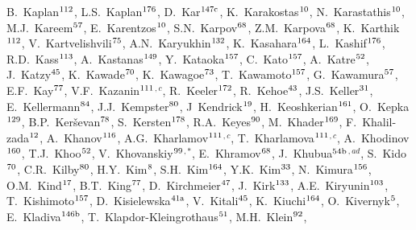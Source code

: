 \begin{flushleft}
B.~Kaplan$^\textrm{\scriptsize 112}$,
L.S.~Kaplan$^\textrm{\scriptsize 176}$,
D.~Kar$^\textrm{\scriptsize 147c}$,
K.~Karakostas$^\textrm{\scriptsize 10}$,
N.~Karastathis$^\textrm{\scriptsize 10}$,
M.J.~Kareem$^\textrm{\scriptsize 57}$,
E.~Karentzos$^\textrm{\scriptsize 10}$,
S.N.~Karpov$^\textrm{\scriptsize 68}$,
Z.M.~Karpova$^\textrm{\scriptsize 68}$,
K.~Karthik$^\textrm{\scriptsize 112}$,
V.~Kartvelishvili$^\textrm{\scriptsize 75}$,
A.N.~Karyukhin$^\textrm{\scriptsize 132}$,
K.~Kasahara$^\textrm{\scriptsize 164}$,
L.~Kashif$^\textrm{\scriptsize 176}$,
R.D.~Kass$^\textrm{\scriptsize 113}$,
A.~Kastanas$^\textrm{\scriptsize 149}$,
Y.~Kataoka$^\textrm{\scriptsize 157}$,
C.~Kato$^\textrm{\scriptsize 157}$,
A.~Katre$^\textrm{\scriptsize 52}$,
J.~Katzy$^\textrm{\scriptsize 45}$,
K.~Kawade$^\textrm{\scriptsize 70}$,
K.~Kawagoe$^\textrm{\scriptsize 73}$,
T.~Kawamoto$^\textrm{\scriptsize 157}$,
G.~Kawamura$^\textrm{\scriptsize 57}$,
E.F.~Kay$^\textrm{\scriptsize 77}$,
V.F.~Kazanin$^\textrm{\scriptsize 111}$$^{,c}$,
R.~Keeler$^\textrm{\scriptsize 172}$,
R.~Kehoe$^\textrm{\scriptsize 43}$,
J.S.~Keller$^\textrm{\scriptsize 31}$,
E.~Kellermann$^\textrm{\scriptsize 84}$,
J.J.~Kempster$^\textrm{\scriptsize 80}$,
J~Kendrick$^\textrm{\scriptsize 19}$,
H.~Keoshkerian$^\textrm{\scriptsize 161}$,
O.~Kepka$^\textrm{\scriptsize 129}$,
B.P.~Ker\v{s}evan$^\textrm{\scriptsize 78}$,
S.~Kersten$^\textrm{\scriptsize 178}$,
R.A.~Keyes$^\textrm{\scriptsize 90}$,
M.~Khader$^\textrm{\scriptsize 169}$,
F.~Khalil-zada$^\textrm{\scriptsize 12}$,
A.~Khanov$^\textrm{\scriptsize 116}$,
A.G.~Kharlamov$^\textrm{\scriptsize 111}$$^{,c}$,
T.~Kharlamova$^\textrm{\scriptsize 111}$$^{,c}$,
A.~Khodinov$^\textrm{\scriptsize 160}$,
T.J.~Khoo$^\textrm{\scriptsize 52}$,
V.~Khovanskiy$^\textrm{\scriptsize 99}$$^{,*}$,
E.~Khramov$^\textrm{\scriptsize 68}$,
J.~Khubua$^\textrm{\scriptsize 54b}$$^{,ad}$,
S.~Kido$^\textrm{\scriptsize 70}$,
C.R.~Kilby$^\textrm{\scriptsize 80}$,
H.Y.~Kim$^\textrm{\scriptsize 8}$,
S.H.~Kim$^\textrm{\scriptsize 164}$,
Y.K.~Kim$^\textrm{\scriptsize 33}$,
N.~Kimura$^\textrm{\scriptsize 156}$,
O.M.~Kind$^\textrm{\scriptsize 17}$,
B.T.~King$^\textrm{\scriptsize 77}$,
D.~Kirchmeier$^\textrm{\scriptsize 47}$,
J.~Kirk$^\textrm{\scriptsize 133}$,
A.E.~Kiryunin$^\textrm{\scriptsize 103}$,
T.~Kishimoto$^\textrm{\scriptsize 157}$,
D.~Kisielewska$^\textrm{\scriptsize 41a}$,
V.~Kitali$^\textrm{\scriptsize 45}$,
K.~Kiuchi$^\textrm{\scriptsize 164}$,
O.~Kivernyk$^\textrm{\scriptsize 5}$,
E.~Kladiva$^\textrm{\scriptsize 146b}$,
T.~Klapdor-Kleingrothaus$^\textrm{\scriptsize 51}$,
M.H.~Klein$^\textrm{\scriptsize 92}$,
$$
\end{flushleft}
